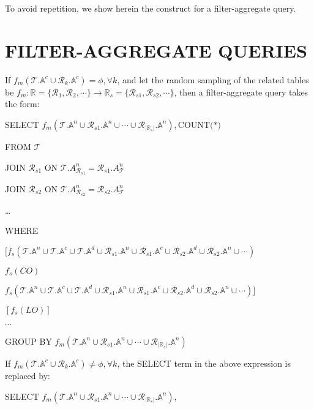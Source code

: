 \documentclass[10pt]{article}
\begin{document}
To avoid repetition, we show herein the construct for a filter-aggregate query.

\section{FILTER-AGGREGATE QUERIES}

If $f_m(\mathcal{T}.\mathbb{A}^c \cup \mathcal{R}_k.\mathbb{A}^c) = \phi,  \forall k$, and let 
the random sampling of the related tables be  $f_m: \mathbb{R}=\{\mathcal{R}_1, \mathcal{R}_2, \cdots\} \rightarrow \mathbb{R}_s=\{\mathcal{R}_{s1}, \mathcal{R}_{s2},\cdots\}$,
then a filter-aggregate query takes the form:

SELECT $f_m(\mathcal{T}.\mathbb{A}^n \cup \mathcal{R}_{s1}.\mathbb{A}^n \cup \cdots \cup \mathcal{R}_{|\mathbb{R}_s|}.\mathbb{A}^n), 
\text{COUNT(*)}$

FROM $\mathcal{T}$

JOIN $\mathcal{R}_{s1}$ ON $\mathcal{T}.A^n_{\mathcal{R}_{s1}}  = \mathcal{R}_{s1}.A^n_{\mathcal{T}}$

JOIN $\mathcal{R}_{s2}$ ON $\mathcal{T}.A^n_{\mathcal{R}_{s2}}  = \mathcal{R}_{s2}.A^n_{\mathcal{T}}$

\dots

WHERE

$[f_s(\mathcal{T}.\mathbb{A}^n \cup \mathcal{T}.\mathbb{A}^c \cup \mathcal{T}.\mathbb{A}^d
\cup \mathcal{R}_{s1}.\mathbb{A}^n \cup \mathcal{R}_{s1}.\mathbb{A}^c \cup \mathcal{R}_{s2}.\mathbb{A}^d \cup \mathcal{R}_{s2}.\mathbb{A}^n \cup \cdots)$

$f_s(CO)$

$f_s(\mathcal{T}.\mathbb{A}^n \cup \mathcal{T}.\mathbb{A}^c \cup \mathcal{T}.\mathbb{A}^d
\cup \mathcal{R}_{s1}.\mathbb{A}^n \cup \mathcal{R}_{s1}.\mathbb{A}^c \cup \mathcal{R}_{s2}.\mathbb{A}^d \cup \mathcal{R}_{s2}.\mathbb{A}^n \cup \cdots)]$

$[f_s(LO)]$

$\cdots$

GROUP BY $f_m(\mathcal{T}.\mathbb{A}^n \cup \mathcal{R}_{s1}.\mathbb{A}^n \cup \cdots \cup \mathcal{R}_{|\mathbb{R}_s|}.\mathbb{A}^n)$



If $f_m(\mathcal{T}.\mathbb{A}^c \cup \mathcal{R}_k.\mathbb{A}^c) \ne \phi, \forall k$, the SELECT term in the above expression is replaced by:

SELECT $f_m(\mathcal{T}.\mathbb{A}^n \cup \mathcal{R}_{s1}.\mathbb{A}^n \cup \cdots \cup \mathcal{R}_{|\mathbb{R}_s|}.\mathbb{A}^n),$
\end{document}
